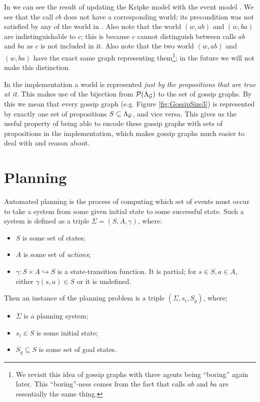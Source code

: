 \documentclass[10pt, a4paper]{report}
\begin{document}
In  we can see the result of updating the Kripke model
 with the event model . We see that the call $cb$ does not have
a corresponding world; its precondition was not satisfied by any of the world in
. Also note that the world $(w, ab)$ and $(w, ba)$ are indistinguishable
to $c$; this is because $c$ cannot distinguish between calls $ab$ and $ba$ as
$c$ is not included in it. Also note that the two world $(w, ab)$ and $(w, ba)$
have the exact same graph representing them\footnote{We revisit this idea of
  gossip graphs with three agents being ``boring'' again later. This
  ``boring''-ness comes from the fact that calls $ab$ and $ba$ are essentially
  the same thing.}; in the future we will not make this distinction.

In the implementation a world is represented \emph{just by the propositions that
  are true at it}. This makes use of the bijection from
$\mathcal{P}(\Lambda_{\mathcal{G}})$ to the set of gossip graphs. By this we mean that
every gossip graph (e.g. Figure \ref{fig:GossipSize3}) is represented by exactly
one set of propositions $S \subseteq \Lambda_{\mathcal{G}}$, and vice versa. This
gives us the useful property of being able to encode these gossip graphs with
sets of propositions in the implementation, which makes gossip graphs much easier to
deal with and reason about.

\section{Planning}
\label{sec:Planning}

Automated planning is the process of computing which set of events must occur to
take a system from some given initial state to some successful state. Such a
system is defined as a triple $\Sigma = (S, A, \gamma)$, where:

\begin{itemize}
\item $S$ is some set of states;
\item $A$ is some set of \emph{actions};
\item $\gamma : S \times A \hookrightarrow S$ is a state-transition function. It
  is partial; for $s \in S, a \in A$, either $\gamma(s, a) \in S$ or it is
  undefined. 
\end{itemize}

Then an instance of the planning problem is a triple $(\Sigma, s_i, S_g)$,
where;

\begin{itemize}
\item $\Sigma$ is a planning system;
\item $s_i \in S$ is some initial state;
\item $S_g \subseteq S$ is some set of goal states.  
\end{itemize}
\end{document}

